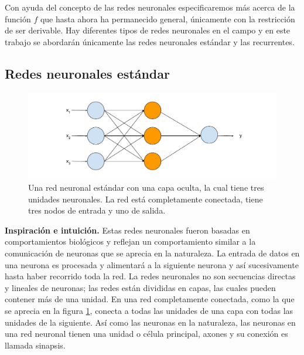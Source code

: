 Con ayuda del concepto de las redes neuronales especificaremos más acerca de la función $f$ que hasta ahora ha permanecido general, únicamente con la restricción de ser derivable. Hay diferentes tipos de redes neuronales en el campo y en este trabajo se abordarán únicamente las redes neuronales estándar y las recurrentes.

\subsection{Redes neuronales estándar}

\begin{figure}
	\includegraphics[scale=.6]{Figures/standardnn.pdf}
	\caption{Una red neuronal estándar con una capa oculta, la cual tiene tres unidades neuronales. La red está completamente conectada, tiene tres nodos de entrada y uno de salida.}
	\label{fig:standardnn}
\end{figure}

\textbf{Inspiración e intuición.} Estas redes neuronales fueron basadas en comportamientos biológicos y reflejan un comportamiento similar a la comunicación de neuronas que se aprecia en la naturaleza. La entrada de datos en una neurona es procesada y alimentará a la siguiente neurona y así sucesivamente hasta haber recorrido toda la red. La redes neuronales no son secuencias directas y lineales de neuronas; las redes están divididas en capas, las cuales pueden contener más de una unidad. En una red completamente conectada, como la que se aprecia en la figura \ref{fig:standardnn}, conecta a todas las unidades de una capa con todas las unidades de la siguiente. Así como las neuronas en la naturaleza, las neuronas en una red neuronal tienen una unidad o célula principal, axones y su conexión es llamada sinapsis.

